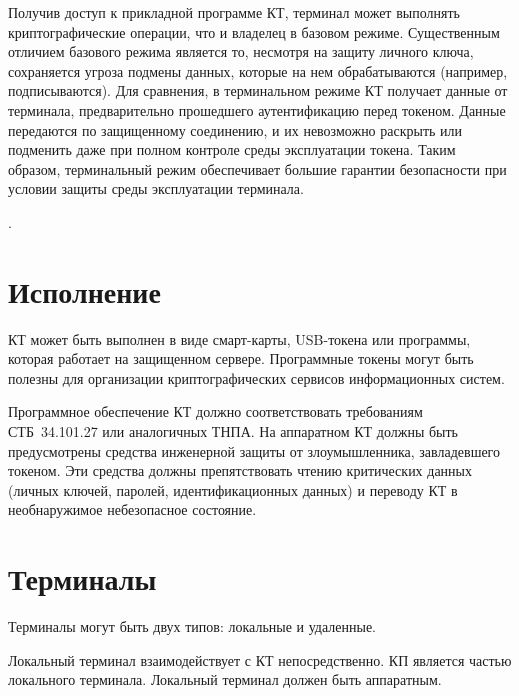 Получив доступ к прикладной программе КТ, терминал может выполнять 
криптографические операции, что и владелец в базовом режиме. Существенным
отличием базового режима является то, несмотря на защиту личного ключа,
сохраняется угроза подмены данных, которые на нем обрабатываются (например,
подписываются). Для сравнения, в терминальном режиме КТ получает данные от
терминала, предварительно прошедшего аутентификацию перед токеном. Данные
передаются по защищенному соединению, и их невозможно раскрыть или подменить
даже при полном контроле среды эксплуатации токена. Таким образом, терминальный
режим обеспечивает большие гарантии безопасности при условии защиты среды 
эксплуатации терминала.

.

\section{Исполнение} 

КТ может быть выполнен в виде смарт-карты, USB-токена 
или программы, которая работает на защищенном сервере. 
Программные токены могут быть полезны для организации криптографических 
сервисов информационных систем. 


Программное обеспечение КТ должно соответствовать требованиям СТБ~34.101.27  или
аналогичных ТНПА. На аппаратном КТ должны быть предусмотрены средства инженерной
защиты от злоумышленника, завладевшего токеном. Эти средства должны
препятствовать чтению критических данных (личных ключей, паролей,
идентификационных данных) и переводу КТ в необнаружимое небезопасное состояние.

\section{Терминалы}

Терминалы могут быть двух типов: локальные и удаленные.

Локальный терминал взаимодействует с КТ непосредственно. КП является 
частью локального терминала. Локальный терминал должен быть аппаратным.

